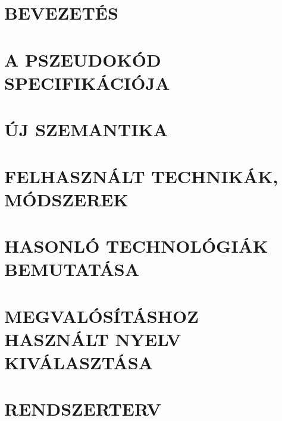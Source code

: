 \documentclass[12pt,a4paper]{article}
\begin{document}







\newpage
\tableofcontents
\newpage





\clearpage
\section{BEVEZETÉS}


\clearpage
\section{A PSZEUDOKÓD SPECIFIKÁCIÓJA}


\clearpage
\section{ÚJ SZEMANTIKA}


\clearpage
\section{FELHASZNÁLT TECHNIKÁK, MÓDSZEREK}


\clearpage
\section{HASONLÓ TECHNOLÓGIÁK BEMUTATÁSA}


\clearpage
\section{MEGVALÓSÍTÁSHOZ HASZNÁLT NYELV KIVÁLASZTÁSA}


\clearpage
\section{RENDSZERTERV}

\end{document}
